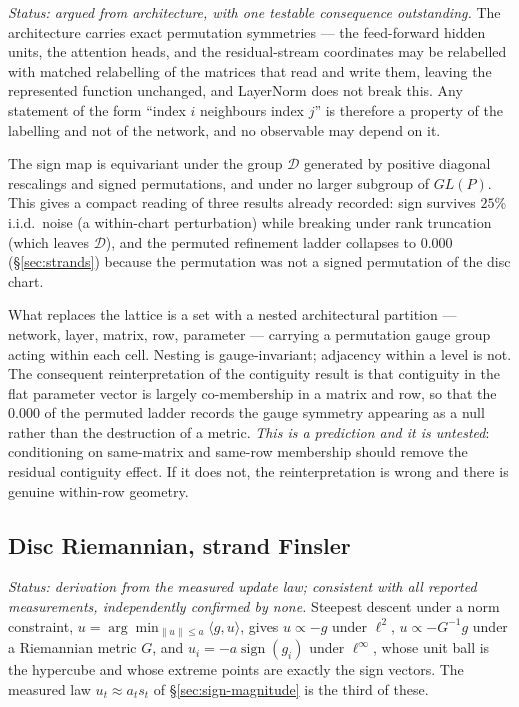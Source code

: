 \emph{Status: argued from architecture, with one testable consequence
outstanding.} The architecture carries exact permutation symmetries --- the
feed-forward hidden units, the attention heads, and the residual-stream
coordinates may be relabelled with matched relabelling of the matrices that
read and write them, leaving the represented function unchanged, and LayerNorm
does not break this. Any statement of the form ``index $i$ neighbours index
$j$'' is therefore a property of the labelling and not of the network, and no
observable may depend on it.

The sign map is equivariant under the group $\mathcal{D}$ generated by positive
diagonal rescalings and signed permutations, and under no larger subgroup of
$GL(P)$. This gives a compact reading of three results already recorded: sign
survives $25\%$ i.i.d.\ noise (a within-chart perturbation) while breaking under
rank truncation (which leaves $\mathcal{D}$), and the permuted refinement
ladder collapses to $0.000$ (\S\ref{sec:strands}) because the permutation was
not a signed permutation of the disc chart.

What replaces the lattice is a set with a nested architectural partition ---
network, layer, matrix, row, parameter --- carrying a permutation gauge group
acting within each cell. Nesting is gauge-invariant; adjacency within a level is
not. The consequent reinterpretation of the contiguity result is that
contiguity in the flat parameter vector is largely co-membership in a matrix
and row, so that the $0.000$ of the permuted ladder records the gauge symmetry
appearing as a null rather than the destruction of a metric. \emph{This is a
prediction and it is untested}: conditioning on same-matrix and same-row
membership should remove the residual contiguity effect. If it does not, the
reinterpretation is wrong and there is genuine within-row geometry.

\subsection{Disc Riemannian, strand Finsler}
\label{sec:finsler}

\emph{Status: derivation from the measured update law; consistent with all
reported measurements, independently confirmed by none.} Steepest descent under
a norm constraint,
$u=\arg\min_{\|u\|\le a}\langle g,u\rangle$, gives $u\propto -g$ under
$\ell^2$, $u\propto -G^{-1}g$ under a Riemannian metric $G$, and
$u_i=-a\operatorname{sign}(g_i)$ under $\ell^\infty$, whose unit ball is the
hypercube and whose extreme points are exactly the sign vectors. The measured
law $u_t\approx a_t s_t$ of \S\ref{sec:sign-magnitude} is the third of these.

